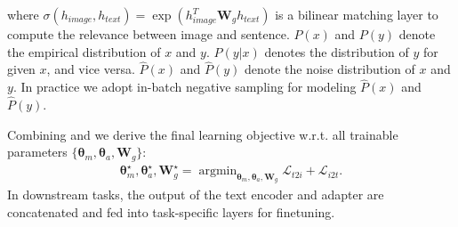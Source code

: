 where $\sigma(h_{image}, h_{text})=\exp (h_{image}^T \bm{W}_{g} h_{text})$ is a bilinear matching layer to compute the relevance between image and sentence. $P(x)$ and $P(y)$ denote the empirical distribution of $x$ and $y$. $P(y|x)$ denotes the distribution of $y$ for given $x$, and vice versa. $\hat{P}(x)$ and $\hat{P}(y)$ denote the noise distribution of $x$ and $y$. In practice we adopt in-batch negative sampling for modeling $\hat{P}(x)$ and $\hat{P}(y)$.

Combining  and  we derive the final learning objective w.r.t. 
all trainable parameters $\{\bm{\theta}_m,\bm{\theta}_a,\bm{W}_g\}$:
\begin{align}
	\bm{\theta}_{m}^\star,\bm{\theta}_{a}^\star,\bm{W}_g^\star = \mathop{\arg\min}_{\bm{\theta}_m,\bm{\theta}_a,\bm{W}_g} \mathcal{L}_{t2i}+\mathcal{L}_{i2t}.
\end{align}
In downstream tasks, the output of the text encoder and adapter are concatenated and fed into task-specific layers for finetuning.
